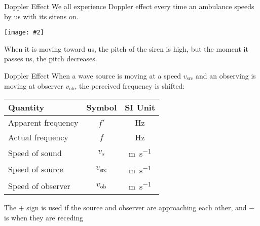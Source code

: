 \documentclass[12pt,aspectratio=169]{beamer}
\newcommand{\pic}[2]{\texttt{[image: \#2]}}
\newcommand{\eq}[2]{\vspace{#1}{\Large\begin{displaymath}#2\end{displaymath}}}
\begin{document}
\begin{frame}{Doppler Effect}
  We all experience Doppler effect every time an ambulance speeds by us with
  its sirens on.
  \begin{center}
    \pic{.6}{toronto-ambulance.jpg}
  \end{center}
  When it is moving toward us, the pitch of the siren is high, but the moment
  it passes us, the pitch decreases.
\end{frame}



\begin{frame}{Doppler Effect}
  When a wave source is moving at a speed $v_{\textrm{src}}$ and an observing is
  moving at observer $v_{\textrm{ob}}$, the perceived frequency is shifted:

  \eq{-.2in}{
    \boxed{f'=\frac{v_s\pm v_{\textrm{ob}}}{v_s\mp v_{\textrm{src}}}f}
  }
  \begin{center}
    \begin{tabular}{l|c|c}
      \rowcolor{pink}
      \textbf{Quantity} & \textbf{Symbol} & \textbf{SI Unit} \\ \hline
      Apparent frequency  & $f'$   & \si{\hertz} \\
      Actual frequency    & $f$    & \si{\hertz} \\
      Speed of sound      & $v_s$ & \si{\metre\per\second}\\
      Speed of source & $v_{\textrm{src}}$ & \si{\metre\per\second}\\
      Speed of observer & $v_{\textrm{ob}}$ & \si{\metre\per\second}
    \end{tabular}
  \end{center}
  The $+$ sign is used if the source and observer are approaching each other,
  and $-$ is when they are receding
\end{frame}
\end{document}

